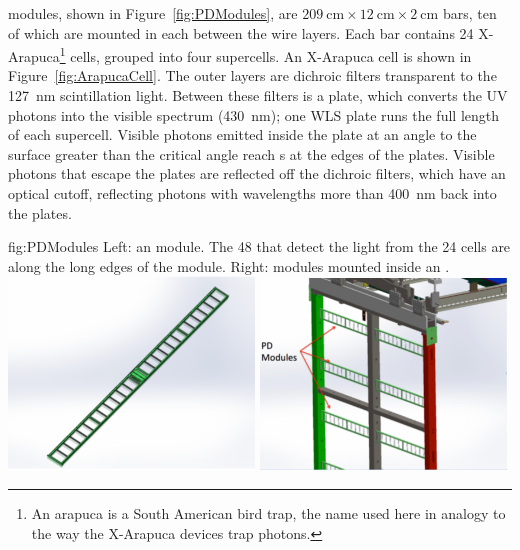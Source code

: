  modules, shown in Figure~\ref{fig:PDModules}, are %
$\SI{209}{\cm}\times\SI{12}{\cm}\times\SI{2}{\cm}$ bars, ten of which are mounted in each  between the wire layers. Each bar contains 24 X-Arapuca\footnote{An arapuca is a South American bird trap, the name used here in analogy to the way the X-Arapuca devices trap photons.} cells, grouped into four supercells. An X-Arapuca cell is shown in Figure~\ref{fig:ArapucaCell}. The outer layers are dichroic filters transparent to the \SI{127}{\nano\meter} scintillation light. Between these filters is a  plate, which converts the UV photons into the visible spectrum (\SI{430}{\nano\meter}); one WLS plate runs the full length of each supercell.
Visible photons emitted inside the  plate at an angle to the surface greater than the critical angle reach s at the edges of the plates. Visible photons that escape the  plates are reflected off the dichroic filters, which have an optical cutoff, reflecting photons with wavelengths more than \SI{400}{\nano\meter} back into the  plates.


\begin{dunefigure}{fig:PDModules}
{Left: an   module. The 48  that detect the light from the 24 cells are along the long edges of the module. Right:   modules mounted inside an .}
\includegraphics[width=0.49\textwidth]{graphics/PDBar.pdf}
\includegraphics[width=0.49\textwidth]{graphics/PDsInAPA.pdf}
\end{dunefigure}

